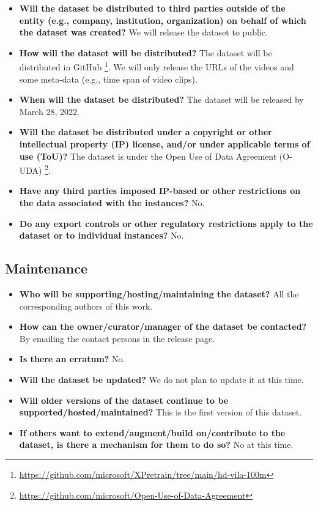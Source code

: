 \begin{itemize}

\item \textbf{Will the dataset be distributed to third parties outside of the entity (e.g., company, institution, organization) on behalf of which the dataset was created?}
We will release the dataset to public.

\item \textbf{How will the dataset will be distributed?}
The dataset will be distributed in GitHub \footnote{\url{https://github.com/microsoft/XPretrain/tree/main/hd-vila-100m}}. We will only release the URLs of the videos and some meta-data (e.g., time span of video clips).

\item \textbf{When will the dataset be distributed?}
The dataset will be released by March 28, 2022.

\item \textbf{Will the dataset be distributed under a copyright or other intellectual property (IP) license, and/or under applicable terms of use (ToU)?} 
The dataset is under the Open Use of Data Agreement (O-UDA) \footnote{\url{https://github.com/microsoft/Open-Use-of-Data-Agreement}}.

\item \textbf{Have any third parties imposed IP-based or other restrictions on the data associated with the instances?}
No.

\item \textbf{Do any export controls or other regulatory restrictions apply to the dataset or to individual instances?} 
No.

\end{itemize}

\subsection{Maintenance}

\begin{itemize}

\item \textbf{Who will be supporting/hosting/maintaining the dataset?}
All the corresponding authors of this work.

\item \textbf{How can the owner/curator/manager of the dataset be contacted?}
By emailing the contact persons in the release page.

\item \textbf{Is there an erratum?}
No.

\item \textbf{Will the dataset be updated?}
We do not plan to update it at this time.

\item \textbf{Will older versions of the dataset continue to be supported/hosted/maintained?} 
This is the first version of this dataset.

\item \textbf{If others want to extend/augment/build on/contribute to the dataset, is there a mechanism for them to do so?} 
No at this time.

\end{itemize}

 